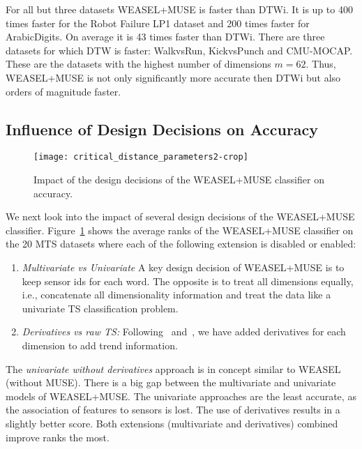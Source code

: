 \documentclass[sigconf]{acmart}
\begin{document}
For all but three datasets WEASEL+MUSE is faster than DTWi. It is up to 400 times faster for the Robot Failure LP1 dataset and 200 times faster for ArabicDigits. On average it is 43 times faster than DTWi. There are three datasets for which DTW is faster: WalkvsRun, KickvsPunch and CMU-MOCAP. These are the datasets with the highest number of dimensions $m=62$. 
Thus, WEASEL+MUSE is not only significantly more accurate then DTWi but also orders of magnitude faster.



\subsection{Influence of Design Decisions on Accuracy}\label{subsec:influence}

\begin{figure}[h]
	\texttt{[image: critical\_distance\_parameters2-crop]}
	\caption{Impact of the design decisions of the WEASEL+MUSE classifier on accuracy.\label{fig:Impact-of-design}}
\end{figure}

We next look into the impact of several design decisions of the WEASEL+MUSE classifier. Figure~\ref{fig:Impact-of-design} shows the average ranks of the WEASEL+MUSE classifier on the 20 MTS datasets where each of the following extension is disabled or enabled: 

 \begin{enumerate}
	\item \emph{Multivariate vs Univariate} A key design decision of WEASEL+MUSE is to keep sensor ids for each word. The opposite is to treat all dimensions equally, i.e., concatenate all dimensionality information and treat the data like a univariate TS classification problem.
	\item \emph{Derivatives vs raw TS:} Following~\cite{wistuba2015ultra} and~\cite{baydogan2015learning}, we have added derivatives for each dimension to add trend information.
 \end{enumerate}

The \emph{univariate without derivatives} approach is in concept similar to WEASEL (without MUSE). There is a big gap between the multivariate and univariate models of WEASEL+MUSE. The univariate approaches are the least accurate, as the association of features to sensors is lost. The use of derivatives results in a slightly better score. Both extensions (multivariate and derivatives) combined improve ranks the most. 
\end{document}
